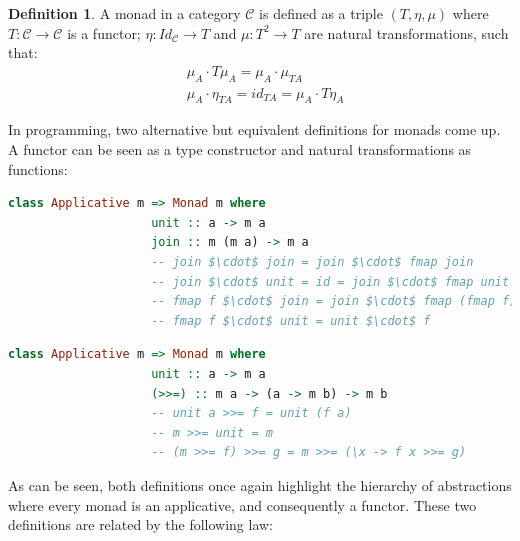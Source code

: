 \documentclass[
  oneside,
  11pt, a4paper,
  footinclude=true,
  headinclude=true,
  cleardoublepage=empty
]{scrbook}
\theoremstyle{definition}
\newtheorem{definition}{Definition}[section]
\theoremstyle{definition}
\begin{document}
	            \begin{definition}{A monad in a category $\mathscr{C}$ is defined as a triple $(T,\eta, \mu)$ where $T : \mathscr{C} \rightarrow \mathscr{C}$ is a functor; $\eta : Id_\mathscr{C} \rightarrow T$ and $\mu : T^2 \rightarrow T$ are natural transformations, such that:}
	                \begin{align*}
	                    &\mu_A \cdot T\mu_A = \mu_A \cdot \mu_{TA} \\
	                    &\mu_A \cdot \eta_{TA} = id_{TA} = \mu_A \cdot T\eta_A
	                \end{align*}{}
	            \end{definition}
	            
	            In programming, two alternative but equivalent definitions for monads come up. A functor can be seen as a type constructor and natural transformations as functions:
	            
	            \begin{lstlisting}[mathescape, language=Haskell, caption={Monad laws and definition in terms of \texttt{unit} and \texttt{join}},captionpos=b]
                class Applicative m => Monad m where
                    unit :: a -> m a
                    join :: m (m a) -> m a
                    -- join $\cdot$ join = join $\cdot$ fmap join
                    -- join $\cdot$ unit = id = join $\cdot$ fmap unit
                    -- fmap f $\cdot$ join = join $\cdot$ fmap (fmap f)
                    -- fmap f $\cdot$ unit = unit $\cdot$ f
	            \end{lstlisting}{}
	            
	            \begin{lstlisting}[language=Haskell, caption={Monad laws and definition in terms of \texttt{unit} and \texttt{bind}},captionpos=b]
                class Applicative m => Monad m where
                    unit :: a -> m a
                    (>>=) :: m a -> (a -> m b) -> m b
                    -- unit a >>= f = unit (f a)
                    -- m >>= unit = m
                    -- (m >>= f) >>= g = m >>= (\x -> f x >>= g)
	            \end{lstlisting}{}
	            
	            As can be seen, both definitions once again highlight the hierarchy of abstractions where every monad is an applicative, and consequently a functor. These two definitions are related by the following law:
	            
\end{document}
